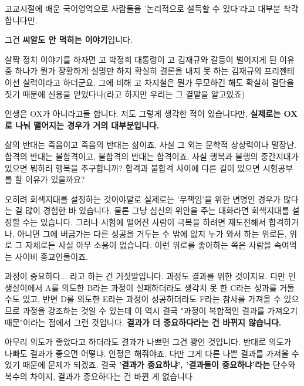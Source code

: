 \vspace{5mm}

고교시절에 배운 국어영역으로 사람들을 '논리적으로 설득할 수 있다'라고 대부분 착각합니다만.
\vspace{5mm}

그건 \textbf{씨알도 안 먹히는 이야기}입니다.
\vspace{5mm}

살짝 정치 이야기를 하자면
고 박정희 대통령이 고 김재규와 갈등이 벌어지게 된 이유 중 하나가
뭔가 장황하게 설명만 하지 확실히 결론을 내지 못 하는 김재규의 프리젠테이션 실력이라고 하더군요.
그에 비해 고 차지철은 뭔가 무모하긴 해도 확실히 결단을 짓기 때문에 신용을 얻었다나(라고 하지만 우리는 그 결말을 알고있죠)
\vspace{5mm}

인생은 OX가 아니라고들 합니다. 저도 그렇게 생각한 적이 있습니다만,
\textbf{실제로는 OX로 나눠 떨어지는 경우가 거의 대부분입니다.}
\vspace{5mm}

삶의 반대는 죽음이고 죽음의 반대는 삶이죠. 사실 그 외는 문학적 상상력이나 말장난.
합격의 반대는 불합격이고, 불합격의 반대는 합격이죠.
사실 행복과 불행의 중간지대가 있으면 뭐하러 행복을 추구합니까?
합격과 불합격 사이에 다른 길이 있으면 시험공부를 할 이유가 있을까요?
\vspace{5mm}

오히려 회색지대를 설정하는 것이야말로 실제로는 '무책임'을 위한 변명인 경우가 많다는 걸 많이 경험한 바 있습니다.
물론 그냥 심신의 위안을 주는 대화라면 회색지대를 설정할 수는 있습니다.
그러나 시험에 떨어진 사람이 극복을 하려면 재도전해서 합격하거나,
아니면 그에 버금가는 다른 성공을 거두는 수 밖에 없지
누가 와서 하는 위로든, 위로 그 자체로든 사실 아무 소용이 없습니다.
이런 위로를 좋아하는 쪽은 사람을 속여먹는 사이비 종교인들이죠.
\vspace{5mm}

과정이 중요하다... 라고 하는 건 거짓말입니다. 과정도 결과를 위한 것이지요.
다만 인생살이에서 A를 의도한 B라는 과정이 실패하더라도 생각치 못 한 C라는 성과를 거둘 수도 있고,
반면 D를 의도한 E라는 과정이 성공하더라도 F라는 참사를 가져올 수 있으므로 과정을 강조하는 것일 수 있는데
이 역시 결국 "과정이 복합적인 결과를 가져오기 때문"이라는 점에서 그런 것입니다. \textbf{결과가 더 중요하다라는 건 바뀌지 않습니다.}
\vspace{5mm}

아무리 의도가 좋았다고 하더라도 결과가 나쁘면 그건 꽝인 것입니다.
반대로 의도가 나빠도 결과가 좋으면 어떻냐. 인정은 해줘야죠. 다만 그게 다른 나쁜 결과를 가져올 수 있기 때문에 문제가 되겠죠.
결국 \textbf{'결과가 중요하냐', '결과들이 중요하냐'라는} 단수와 복수의 차이지, 결과가 중요하다는 건 바뀐 게 없습니다
\vspace{5mm}

